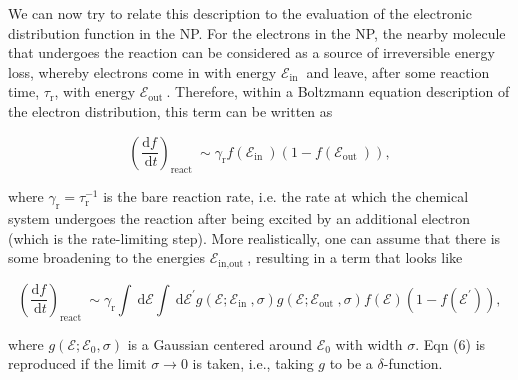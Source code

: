 \documentclass[10pt]{article}
\begin{document}
We can now try to relate this description to the evaluation of the electronic distribution function in the NP. For the electrons in the NP, the nearby molecule that undergoes the reaction can be considered as a source of irreversible energy loss, whereby electrons come in with energy $\mathcal{E}_{\text {in }}$ and leave, after some reaction time, $\tau_{\mathrm{r}}$, with energy $\mathcal{E}_{\text {out }}$. Therefore, within a Boltzmann equation description of the electron distribution, this term can be written as


\begin{equation*}
\left(\frac{\mathrm{d} f}{\mathrm{~d} t}\right)_{\text {react }} \sim \gamma_{\mathrm{r}} f\left(\mathcal{E}_{\text {in }}\right)\left(1-f\left(\mathcal{E}_{\text {out }}\right)\right), \tag{6}
\end{equation*}


where $\gamma_{\mathrm{r}}=\tau_{\mathrm{r}}^{-1}$ is the bare reaction rate, i.e. the rate at which the chemical system undergoes the reaction after being excited by an additional electron (which is the rate-limiting step). More realistically, one can assume that there is some broadening to the energies $\mathcal{E}_{\text {in,out }}$, resulting in a term that looks like


\begin{equation*}
\left(\frac{\mathrm{d} f}{\mathrm{~d} t}\right)_{\text {react }} \sim \gamma_{\mathrm{r}} \int \mathrm{~d} \mathcal{E} \int \mathrm{~d} \mathcal{E}^{\prime} g\left(\mathcal{E} ; \mathcal{E}_{\text {in }}, \sigma\right) g\left(\mathcal{E} ; \mathcal{E}_{\text {out }}, \sigma\right) f(\mathcal{E})\left(1-f\left(\mathcal{E}^{\prime}\right)\right), \tag{7}
\end{equation*}


where $g\left(\mathcal{E} ; \mathcal{E}_{0}, \sigma\right)$ is a Gaussian centered around $\mathcal{E}_{0}$ with width $\sigma$. Eqn (6) is reproduced if the limit $\sigma \rightarrow 0$ is taken, i.e., taking $g$ to be a $\delta$-function.
\end{document}
